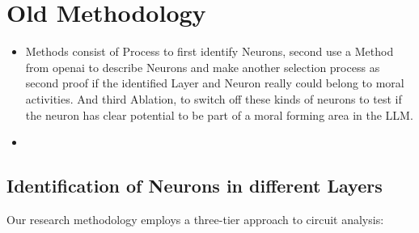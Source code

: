 \usepackage[utf8]{inputenc}
\usepackage[T1]{fontenc}
\usepackage{graphicx}
\usepackage{amsmath}






\section{Old Methodology}


\begin{itemize}
    \item Methods consist of Process to first identify Neurons, second use a Method from openai to describe Neurons and make another selection process as second proof if the identified Layer and Neuron really could belong to moral activities. And third Ablation, to switch off these kinds of neurons to test if the neuron has clear potential to be part of  a moral forming area in the LLM.
    \item <Enter a diagram about these three phases >
\end{itemize}


\subsection{Identification of Neurons in different Layers}

Our research methodology employs a three-tier approach to circuit analysis:

